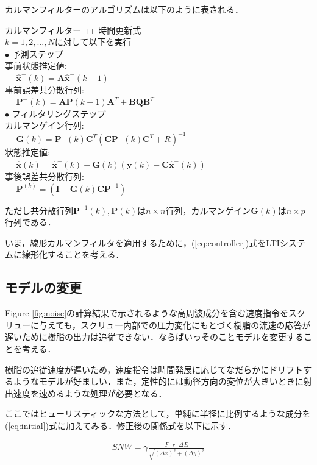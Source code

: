 \documentclass[twocolumn,oneside,a4paper]{article}
\begin{document}
カルマンフィルターのアルゴリズムは以下のように表される．
  \begin{itembox}[l]{カルマンフィルター}
    $\Box$ 時間更新式\\
    $k=1,2,...,N$に対して以下を実行\\
	$\bullet$ 予測ステップ\\
	事前状態推定値: \\
	$\:\:\:\:\:\: \hat{\bm{x}}^{-}(k) = \bm{A}\hat{\bm{x}}^{-}(k-1)$\\
	事前誤差共分散行列: \\
	$\:\:\:\:\:\: \bm{P}^{-}(k)=\bm{A}\bm{P}(k-1)\bm{A}^{T}+\bm{BQ}\bm{B}^T$\\		
	$\bullet$ フィルタリングステップ\\
	カルマンゲイン行列: \\
	$\:\:\:\:\:\: \bm{G}(k)=\bm{P}^{-}(k)\bm{C}^T(\bm{C}\bm{P}^{-}(k)\bm{C}^{T}+R)^{-1}$\\
	状態推定値: \\
	$\:\:\:\:\:\: \hat{\bm{x}}(k) = \hat{\bm{x}}^{-}(k) + \bm{G}(k)(\bm{y}(k)-\bm{C}\hat{\bm{x}}^{-}(k))$\\
	事後誤差共分散行列: \\
	$\:\:\:\:\:\: \bm{P}^(k)=(\bm{I}-\bm{G}(k)\bm{C}\bm{P}^{-1})$
  \end{itembox}

ただし共分散行列$\bm{P}^{-1}(k), \bm{P}(k)$は$n \times n$行列，カルマンゲイン$\bm{G}(k)$は$n \times p$行列である．

いま，線形カルマンフィルタを適用するために，(\ref{eq:controller})式をLTIシステムに線形化することを考える．


\subsection{モデルの変更}
Figure \ref{fig:noise}の計算結果で示されるような高周波成分を含む速度指令をスクリューに与えても，スクリュー内部での圧力変化にもとづく樹脂の流速の応答が遅いために樹脂の出力は追従できない．ならばいっそのことモデルを変更することを考える．

樹脂の追従速度が遅いため，速度指令は時間発展に応じてなだらかにドリフトするようなモデルが好ましい．また，定性的には動径方向の変位が大きいときに射出速度を速めるような処理が必要となる．

ここではヒューリスティックな方法として，単純に半径に比例するような成分を(\ref{eq:initial})式に加えてみる．修正後の関係式を以下に示す．

\begin{eqnarray}\label{eq:fix}
  SNW = \gamma \frac{F\cdot r\cdot  \Delta E}{\sqrt{(\Delta x)^2+(\Delta y)^2}} 
\end{eqnarray}
\end{document}
